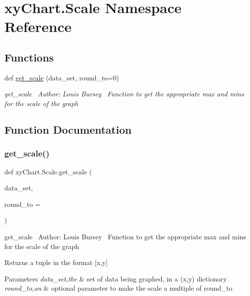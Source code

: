 \hypertarget{namespacexy_chart_1_1_scale}{}\section{xy\+Chart.\+Scale Namespace Reference}
\label{namespacexy_chart_1_1_scale}
\subsection*{Functions}
\begin{DoxyCompactItemize}
\item 
def \hyperlink{namespacexy_chart_1_1_scale_a9fc5f2fc7312451b91adac079fff0ae7}{get\+\_\+scale} (data\+\_\+set, round\+\_\+to=0)
\begin{DoxyCompactList}\small\item\em get\+\_\+scale~\newline
 Author\+: Louis Bursey~\newline
 Function to get the appropriate max and mins for the scale of the graph~\newline
\end{DoxyCompactList}\end{DoxyCompactItemize}


\subsection{Function Documentation}
\hypertarget{namespacexy_chart_1_1_scale_a9fc5f2fc7312451b91adac079fff0ae7}{}\label{namespacexy_chart_1_1_scale_a9fc5f2fc7312451b91adac079fff0ae7} 
\subsubsection{\texorpdfstring{get\+\_\+scale()}{get\_scale()}}
{\footnotesize\ttfamily def xy\+Chart.\+Scale.\+get\+\_\+scale (\begin{DoxyParamCaption}\item[{}]{data\+\_\+set,  }\item[{}]{round\+\_\+to = {} }\end{DoxyParamCaption})}



get\+\_\+scale~\newline
 Author\+: Louis Bursey~\newline
 Function to get the appropriate max and mins for the scale of the graph~\newline


\begin{DoxyReturn}{Returns}
a tuple in the format \mbox{[}x,y\mbox{]} 
\end{DoxyReturn}

\begin{DoxyParams}{Parameters}
{\em data\+\_\+set,the} & set of data being graphed, in a (x,y) dictionary \\
\hline
{\em round\+\_\+to,an} & optional parameter to make the scale a multiple of round\+\_\+to \\
\hline
\end{DoxyParams}
